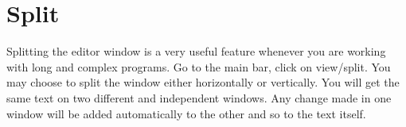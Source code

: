 
\section{Split}

Splitting the editor window is a very useful feature whenever you are working with long and complex programs.
Go to the main bar, click on view/split. You may choose to split the window either horizontally or vertically.
You will get the same text on two different and independent windows.
Any change made in one window will be added automatically to the other and so to the text itself.
